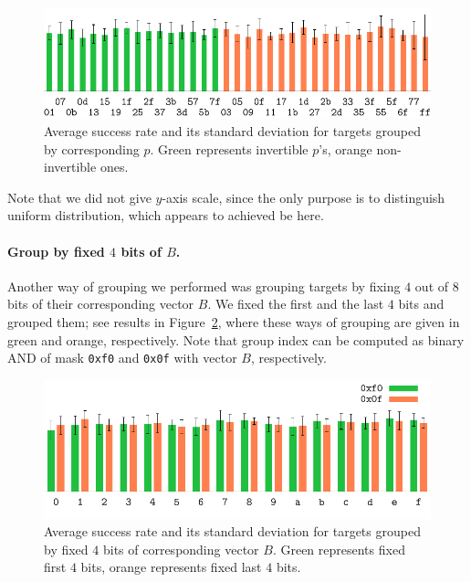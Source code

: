 	\begin{figure}[h]
	\begin{center}
		\includegraphics{figures/leak_target/leak_target.pdf}
		\caption{Average success rate and its standard deviation for targets grouped by corresponding $p$. Green represents invertible $p$'s, orange non-invertible ones.}
		\label{fig:leaktargethist}
	\end{center}
	\end{figure}
	
	Note that we did not give $y$-axis scale, since the only purpose is to distinguish uniform distribution, which appears to achieved be here.
	
	\paragraph{Group by fixed $4$ bits of $B$.}
	
	Another way of grouping we performed was grouping targets by fixing $4$ out of $8$ bits of their corresponding vector $B$. We fixed the first and the last $4$ bits and grouped them; see results in Figure~\ref{fig:leaktargetotherhist}, where these ways of grouping are given in green and orange, respectively. Note that group index can be computed as binary AND of mask {\tt 0xf0} and {\tt 0x0f} with vector $B$, respectively.
	
	\begin{figure}[h]
	\begin{center}
		\includegraphics{figures/leak_target_other/leak_0x0f_0xf0.pdf}
		\caption{Average success rate and its standard deviation for targets grouped by fixed $4$ bits of corresponding vector $B$. Green represents fixed first $4$ bits, orange represents fixed last $4$ bits.}
		\label{fig:leaktargetotherhist}
	\end{center}
	\end{figure}
	
